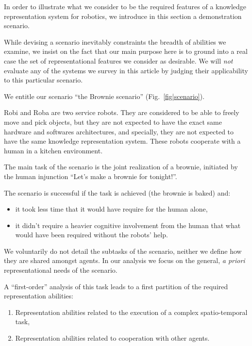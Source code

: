 In order to illustrate what we consider to be the required features of a
knowledge representation system for robotics, we introduce in this section a
demonstration scenario.

While devising a scenario inevitably constraints the breadth of abilities we
examine, we insist on the fact that our main purpose here is to ground into a
real case the set of representational features we consider as desirable.  We
will \emph{not} evaluate any of the systems we survey in this article by
judging their applicability to this particular scenario.

We entitle our scenario ``the Brownie scenario'' (Fig.~\ref{fig|scenario}).

Robi and Roba are two service robots. They are considered to be able to freely
move and pick objects, but they are not expected to have the exact same
hardware and softwares architectures, and specially, they are not expected to
have the same knowledge representation system. These robots cooperate with a
human in a kitchen environment.

The main task of the scenario is the joint realization of a brownie, initiated
by the human injunction ``Let's make a brownie for tonight!''.

The scenario is successful if the task is achieved (the brownie is baked) and:

\begin{itemize} 

	\item it took less time that it would have require for the human alone, 

	\item it didn't require a heavier cognitive involvement from the human that
	what would have been required without the robots' help.  

\end{itemize}

We voluntarily do not detail the subtasks of the scenario, neither we define
how they are shared amongst agents. In our analysis we focus on the general,
\textit{a priori} representational needs of the scenario.

A ``first-order'' analysis of this task leads to a first partition of the
required representation abilities:

\begin{enumerate}

	\item Representation abilities related to the execution of a complex
	spatio-temporal task,

	\item Representation abilities related to cooperation with other agents.

\end{enumerate}

